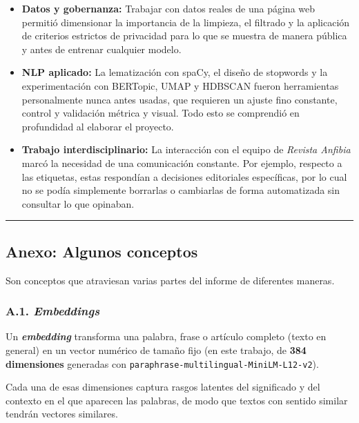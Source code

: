 \documentclass[
]{article}
\begin{document}
\begin{itemize}
\item
  \textbf{Datos y gobernanza:} Trabajar con datos reales de una página
  web permitió dimensionar la importancia de la limpieza, el filtrado y
  la aplicación de criterios estrictos de privacidad para lo que se
  muestra de manera pública y antes de entrenar cualquier modelo.
\item
  \textbf{NLP aplicado:} La lematización con spaCy, el diseño de
  stopwords y la experimentación con BERTopic, UMAP y HDBSCAN fueron
  herramientas personalmente nunca antes usadas, que requieren un ajuste
  fino constante, control y validación métrica y visual. Todo esto se
  comprendió en profundidad al elaborar el proyecto.
\item
  \textbf{Trabajo interdisciplinario:} La interacción con el equipo de
  \emph{Revista Anfibia} marcó la necesidad de una comunicación
  constante. Por ejemplo, respecto a las etiquetas, estas respondían a
  decisiones editoriales específicas, por lo cual no se podía
  simplemente borrarlas o cambiarlas de forma automatizada sin consultar
  lo que opinaban.
\end{itemize}

\begin{center}\rule{0.5\linewidth}{0.5pt}\end{center}

\subsection{Anexo: Algunos conceptos}\label{anexo-algunos-conceptos}

Son conceptos que atraviesan varias partes del informe de diferentes
maneras.

\subsubsection{\texorpdfstring{A.1.
\emph{Embeddings}}{A.1. Embeddings}}\label{a.1.-embeddings}

Un \textbf{\emph{embedding}} transforma una palabra, frase o artículo
completo (texto en general) en un vector numérico de tamaño fijo (en
este trabajo, de \textbf{384 dimensiones} generadas con
\texttt{paraphrase-multilingual-MiniLM-L12-v2}).

Cada una de esas dimensiones captura rasgos latentes del significado y
del contexto en el que aparecen las palabras, de modo que textos con
sentido similar tendrán vectores similares.
\end{document}
